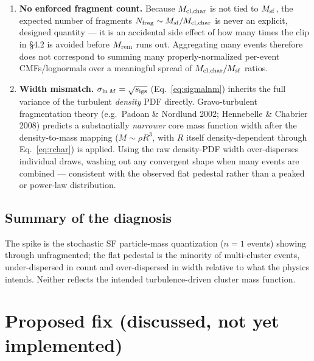 \documentclass[11pt]{article}
\begin{document}
\begin{enumerate}
  \item \textbf{No enforced fragment count.} Because $M_{\rm cl,char}$ is
        not tied to $M_{\rm sf}$, the expected number of fragments $N_{\rm
        frag} \sim M_{\rm sf}/M_{\rm cl,char}$ is never an explicit,
        designed quantity --- it is an accidental side effect of how many
        times the clip in \S4.2 is avoided before $M_{\rm rem}$ runs out.
        Aggregating many events therefore does not correspond to summing
        many properly-normalized per-event CMFs/lognormals over a
        meaningful spread of $M_{\rm cl,char}/M_{\rm sf}$ ratios.
  \item \textbf{Width mismatch.} $\sigma_{\ln M} = \sqrt{s_{\rm igs}}$
        (Eq.~\ref{eq:sigmalnm}) inherits the full variance of the
        turbulent \emph{density} PDF directly. Gravo-turbulent
        fragmentation theory (e.g.\ Padoan \& Nordlund 2002; Hennebelle \&
        Chabrier 2008) predicts a substantially \emph{narrower} core mass
        function width after the density-to-mass mapping
        ($M \sim \rho R^3$, with $R$ itself density-dependent through
        Eq.~\ref{eq:rchar}) is applied. Using the raw density-PDF width
        over-disperses individual draws, washing out any convergent shape
        when many events are combined --- consistent with the observed
        flat pedestal rather than a peaked or power-law distribution.
\end{enumerate}

\subsection{Summary of the diagnosis}

The spike is the stochastic SF particle-mass quantization ($n=1$ events)
showing through unfragmented; the flat pedestal is the minority of
multi-cluster events, under-dispersed in count and over-dispersed in width
relative to what the physics intends. Neither reflects the intended
turbulence-driven cluster mass function.

\section{Proposed fix (discussed, not yet implemented)}
\end{document}
